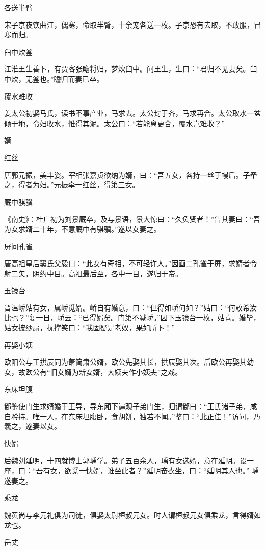 \documentclass[a4paper,12pt,UTF8,twoside]{ctexbook}
\begin{document}
    各送半臂
    
    宋子京夜饮曲江，偶寒，命取半臂，十余宠各送一枚。子京恐有去取，不敢服，冒寒而归。
    
    臼中炊釜
    
    江淮王生善卜，有贾客张瞻将归，梦炊臼中。问王生，生曰：“君归不见妻矣。臼中炊，无釜也。”瞻归而妻已卒。
    
    覆水难收
    
    姜太公初娶马氏，读书不事产业，马求去。太公封于齐，马求再合。太公取水一盆倾于地，令妇收水，惟得其泥。太公曰：“若能离更合，覆水岂难收？”
    
    婿
    
    红丝
    
    唐郭元振，美丰姿。宰相张嘉贞欲纳为婿，曰：“吾五女，各持一丝于幔后。子牵之，得者为妇。”元振牵一红丝，得第三女。
    
    厩中骐骥
    
    《南史》：杜广初为刘景厩卒，及与景语，景大惊曰：“久负贤者！”告其妻曰：“吾为女求婿二十年，不意厩中有骐骥。”遂以女妻之。
    
    屏间孔雀
    
    唐高祖皇后窦氏父毅曰：“此女有奇相，不可轻许人。”因画二孔雀于屏，求婿者令射二矢，阴约中目。高祖最后至，各中一目，遂归于帝。
    
    玉镜台
    
    晋温峤姑有女，属峤觅婿。峤自有婚意，曰：“但得如峤何如？”姑曰：“何敢希汝比也？”复一日，峤云：“已得婿矣。门第不减峤。”因下玉镜台一枚，姑喜。婚毕，姑女披纱扇，抚撑笑曰：“我固疑是老奴，果如所卜！”
    
    再娶小姨
    
    欧阳公与王拱辰同为萧简肃公婿，欧公先娶其长，拱辰娶其次。后欧公再娶其幼女，故欧公有“旧女婿为新女婿，大姨夫作小姨夫”之戏。
    
    东床坦腹
    
    郗鉴使门生求婿婚于王导，导东厢下遍观子弟门生，归谓郗曰：“王氏诸子弟，咸自矜持。唯一人，在东床坦腹卧，食胡饼，独若不闻。”鉴曰：“此正佳！”访问，乃羲之，遂妻以女。
    
    快婿
    
    后魏刘延明，十四就博士郭瑀学。弟子五百余人，瑀有女选婿，意在延明。设一座，曰：“吾有女，欲觅一快婿，谁坐此者？”延明奋衣坐，曰：“延明其人也。” 瑀遂妻之。
    
    乘龙
    
    魏黄尚与李元礼俱为司徒，俱娶太尉桓叔元女。时人谓桓叔元女俱乘龙，言得婿如龙也。
    
    岳丈
    
\end{document}
